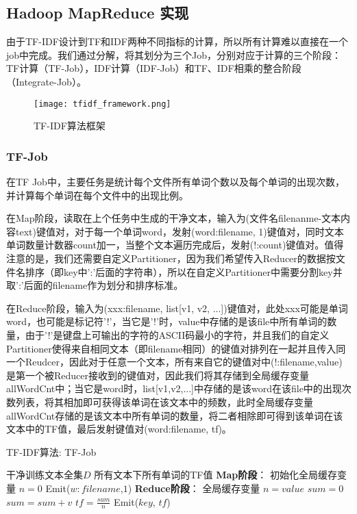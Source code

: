 \documentclass[lang=cn,11pt]{elegantpaper}
\begin{document}
\subsection{Hadoop MapReduce 实现}
由于TF-IDF设计到TF和IDF两种不同指标的计算，所以所有计算难以直接在一个job中完成。我们通过分解，将其划分为三个Job，分别对应于计算的三个阶段：TF计算（TF-Job），IDF计算（IDF-Job）和TF、IDF相乘的整合阶段（Integrate-Job）。

\begin{figure}[htbp]
	\centering
	\texttt{[image: tfidf\_framework.png]}
	\caption{TF-IDF算法框架 \label{fig:tfidf_framework}}
\end{figure}

\subsubsection{TF-Job}
在TF Job中，主要任务是统计每个文件所有单词个数以及每个单词的出现次数，并计算每个单词在每个文件中的出现比例。\par
在Map阶段，读取在上个任务中生成的干净文本，输入为(文件名filenanme-文本内容text)键值对，对于每一个单词word，发射(word:filename, 1)键值对，同时文本单词数量计数器count加一，当整个文本遍历完成后，发射(!:count)键值对。值得注意的是，我们还需要自定义Partitioner，因为我们希望传入Reducer的数据按文件名排序（即key中':'后面的字符串），所以在自定义Partitioner中需要分割key并取':'后面的filename作为划分和排序标准。\par
在Reduce阶段，输入为(xxx:filename, list[v1, v2, ...])键值对，此处xxx可能是单词word，也可能是标记符'!'，当它是'!'时，value中存储的是该file中所有单词的数量，由于'!'是键盘上可输出的字符的ASCII码最小的字符，并且我们的自定义Partitioner使得来自相同文本（即filename相同）的键值对排列在一起并且传入同一个Reudcer，因此对于任意一个文本，所有来自它的键值对中(!:filename,value)是第一个被Reducer接收到的键值对，因此我们将其存储到全局缓存变量allWordCnt中；当它是word时，list[v1,v2,...]中存储的是该word在该file中的出现次数列表，将其相加即可获得该单词在该文本中的频数，此时全局缓存变量allWordCnt存储的是该文本中所有单词的数量，将二者相除即可得到该单词在该文本中的TF值，最后发射键值对(word:filename, tf)。\par
\begin{algorithm}[!htb]  
  \caption{TF-IDF算法: TF-Job}  
  \label{alg:Framwork}
  \begin{algorithmic}[1]
    \Require
    干净训练文本全集$D$
    \Ensure
    所有文本下所有单词的TF值
    \State \textbf{Map阶段}：
    \State 初始化全局缓存变量 $n=0$
    \EndFunction
        \State Emit($w:filename$,$1$)
      \EndFor
    \EndFunction
    \State \textbf{Reduce阶段}：
      \State 全局缓存变量 $n=value$
    \Else
      \State $sum=0$
        \State $sum = sum + v$
      \EndFor
      \State $tf = \frac{sum}{n}$
      \State Emit($key$, $tf$)
    \EndIf
    \EndFunction
  \end{algorithmic}
\end{algorithm}
\end{document}
